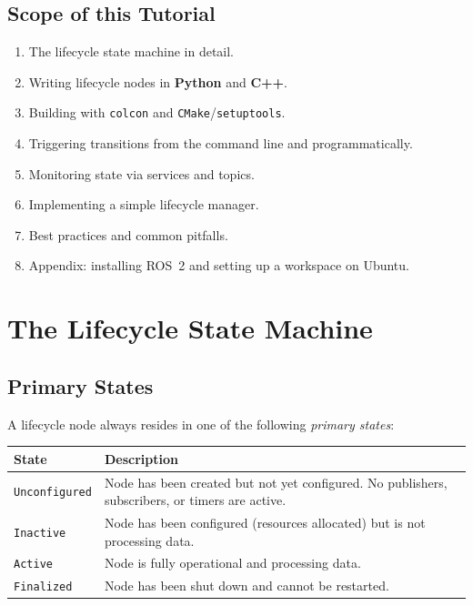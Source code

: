 \documentclass[12pt,a4paper]{article}
\newcommand{\code}[1]{\texttt{#1}}
\begin{document}
\subsection{Scope of this Tutorial}

\begin{enumerate}[noitemsep]
  \item The lifecycle state machine in detail.
  \item Writing lifecycle nodes in \textbf{Python} and \textbf{C++}.
  \item Building with \code{colcon} and \code{CMake}/\code{setuptools}.
  \item Triggering transitions from the command line and programmatically.
  \item Monitoring state via services and topics.
  \item Implementing a simple lifecycle manager.
  \item Best practices and common pitfalls.
  \item Appendix: installing ROS~2 and setting up a workspace on Ubuntu.
\end{enumerate}

\section{The Lifecycle State Machine}
\label{sec:statemachine}

\subsection{Primary States}

A lifecycle node always resides in one of the following \emph{primary states}:

\begin{center}
\begin{tabular}{lp{9cm}}
  \toprule
  \textbf{State} & \textbf{Description} \\
  \midrule
  \texttt{Unconfigured} & Node has been created but not yet configured.
                           No publishers, subscribers, or timers are active. \\
  \texttt{Inactive}     & Node has been configured (resources allocated) but
                           is not processing data. \\
  \texttt{Active}       & Node is fully operational and processing data. \\
  \texttt{Finalized}    & Node has been shut down and cannot be restarted. \\
  \bottomrule
\end{tabular}
\end{center}
\end{document}

